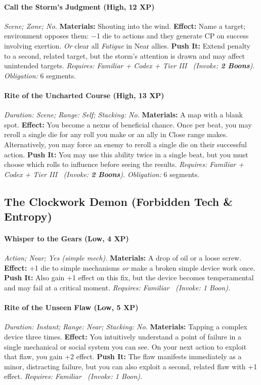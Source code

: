 \documentclass[12pt,twoside]{book}
\begin{document}
\paragraph{Call the Storm's Judgment (High, 12 XP)} \emph{Scene; Zone; No.}
\textbf{Materials:} Shouting into the wind.
\textbf{Effect:} Name a target; environment opposes them: −1 die to actions and they generate CP on success involving exertion. \emph{Or} clear all \emph{Fatigue} in Near allies.
\textbf{Push It:} Extend penalty to a second, related target, but the storm's attention is drawn and may affect unintended targets.
\emph{Requires: Familiar + Codex + Tier III \ (\textit{Invoke:} \textbf{2 Boons}).}
\emph{Obligation:} 6 segments.

\paragraph{Rite of the Uncharted Course (High, 13 XP)} \emph{Duration: Scene; Range: Self; Stacking: No.}
\textbf{Materials:} A map with a blank spot.
\textbf{Effect:} You become a nexus of beneficial chance. Once per beat, you may reroll a single die for any roll you make or an ally in Close range makes. Alternatively, you may force an enemy to reroll a single die on their successful action.
\textbf{Push It:} You may use this ability twice in a single beat, but you must choose which rolls to influence before seeing the results.
\emph{Requires: Familiar + Codex + Tier III \ (\textit{Invoke:} \textbf{2 Boons}).}
\emph{Obligation:} 6 segments.

\subsection{The Clockwork Demon (Forbidden Tech \& Entropy)}
\paragraph{Whisper to the Gears (Low, 4 XP)} \emph{Action; Near; Yes (simple mech).}
\textbf{Materials:} A drop of oil or a loose screw.
\textbf{Effect:} +1 die to simple mechanisms \emph{or} make a broken simple device work once.
\textbf{Push It:} Also gain +1 effect on this fix, but the device becomes temperamental and may fail at a critical moment.
\emph{Requires: Familiar \ (\textit{Invoke:} 1 Boon).}
\paragraph{Rite of the Unseen Flaw (Low, 5 XP)} \emph{Duration: Instant; Range: Near; Stacking: No.}
\textbf{Materials:} Tapping a complex device three times.
\textbf{Effect:} You intuitively understand a point of failure in a single mechanical or social system you can see. On your next action to exploit that flaw, you gain +2 effect.
\textbf{Push It:} The flaw manifests immediately as a minor, distracting failure, but you can also exploit a second, related flaw with +1 effect.
\emph{Requires: Familiar \ (\textit{Invoke:} 1 Boon).}
\end{document}
